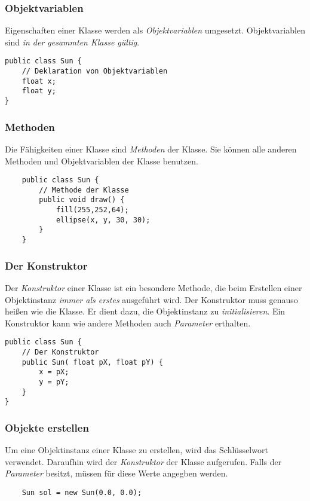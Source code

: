 \documentclass[10pt, a4paper]{arbeitsblatt}
\begin{document}
\begin{multicols}{2}
\subsubsection*{Objektvariablen}
Eigenschaften einer Klasse werden als \emph{Objektvariablen} umgesetzt. Objektvariablen sind \emph{in der gesammten Klasse gültig}.
\begin{verbatim}
public class Sun {
	// Deklaration von Objektvariablen
	float x;
	float y;
}
\end{verbatim}

\subsubsection*{Methoden}
Die Fähigkeiten einer Klasse sind \emph{Methoden} der Klasse. Sie können alle anderen Methoden und Objektvariablen der Klasse benutzen.
\begin{verbatim}
	public class Sun {
		// Methode der Klasse
		public void draw() {
			fill(255,252,64);
			ellipse(x, y, 30, 30);
		}
	}
	\end{verbatim}

\columnbreak
\subsubsection*{Der Konstruktor}
Der \emph{Konstruktor} einer Klasse ist ein besondere Methode, die beim Erstellen einer Objektinstanz \emph{immer als erstes} ausgeführt wird. Der Konstruktor muss genauso heißen wie die Klasse. Er dient dazu, die Objektinstanz zu \emph{initialisieren}. Ein Konstruktor kann wie andere Methoden auch \emph{Parameter} erthalten.
\begin{verbatim}
public class Sun {
	// Der Konstruktor
	public Sun( float pX, float pY) {
		x = pX;
		y = pY;
	}
}
\end{verbatim}

\subsubsection*{Objekte erstellen}
Um eine Objektinstanz einer Klasse zu erstellen, wird das Schlüsselwort  verwendet. Daraufhin wird der \emph{Konstruktor} der Klasse aufgerufen. Falls der \emph{Parameter} besitzt, müssen für diese Werte angegben werden.
\begin{verbatim}
	Sun sol = new Sun(0.0, 0.0);
\end{verbatim}
\end{multicols}
\end{document}

